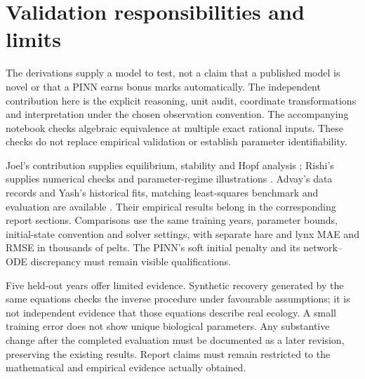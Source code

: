 \section{Validation responsibilities and limits}
The derivations supply a model to test, not a claim that a published model is novel
or that a PINN earns bonus marks automatically. The independent contribution here
is the explicit reasoning, unit audit, coordinate transformations and interpretation
under the chosen observation convention. The accompanying notebook checks algebraic
equivalence at multiple exact rational inputs. These checks do not replace empirical
validation or establish parameter identifiability.

Joel's contribution supplies equilibrium, stability and Hopf analysis
\cite{arnav_joel2026}; Rishi's supplies numerical checks and parameter-regime
illustrations \cite{arnav_rishi2026}. Advay's data records and Yash's historical
fits, matching least-squares benchmark and evaluation are available
\cite{arnav_advay2026,arnav_historical2026}. Their empirical results belong in the
corresponding report sections. Comparisons use the same training years,
parameter bounds, initial-state convention and solver settings, with separate
hare and lynx MAE and RMSE in thousands of pelts. The PINN's soft initial penalty
and its network--ODE discrepancy must remain visible qualifications.

Five held-out years offer limited evidence. Synthetic recovery generated by the
same equations checks the inverse procedure under favourable assumptions; it is
not independent evidence that those equations describe real ecology. A small
training error does not show unique biological parameters. Any substantive change
after the completed evaluation must be documented as a later revision, preserving
the existing results. Report claims must remain restricted to the mathematical
and empirical evidence actually obtained.

